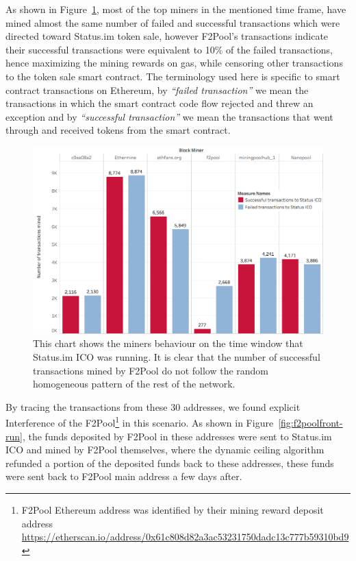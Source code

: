 As shown in Figure~\ref{fig:Transactions_miners_while_status_ico_cut}, most of the top miners in the mentioned time frame, have mined almost the same number of failed and successful transactions which were directed toward Status.im token sale, however F2Pool's transactions indicate their successful transactions were equivalent to 10\% of the failed transactions, hence maximizing the mining rewards on gas, while censoring other transactions to the token sale smart contract. The terminology used here is specific to smart contract transactions on Ethereum, by \textit{``failed transaction''} we mean the transactions in which the smart contract code flow rejected and threw an exception and by \textit{``successful transaction''} we mean the transactions that went through and received tokens from the smart contract. 


\begin{figure}[h]
\centering
\includegraphics[width=0.7\linewidth]{figures/Transactions_miners_while_status_ico_cut_only_icotx.png}
\caption{This chart shows the miners behaviour on the time window that Status.im ICO was running. It is clear that the number of successful transactions mined by F2Pool do not follow the random homogeneous pattern of the rest of the network. \label{fig:Transactions_miners_while_status_ico_cut}} 
\end{figure}


By tracing the transactions from these 30 addresses, we found explicit Interference of the F2Pool\footnote{F2Pool Ethereum address was identified by their mining reward deposit address \url{https://etherscan.io/address/0x61c808d82a3ac53231750dadc13c777b59310bd9}} in this scenario. As shown in Figure~\ref{fig:f2poolfront-run}, the funds deposited by F2Pool in these addresses were sent to Status.im ICO and mined by F2Pool themselves, where the dynamic ceiling algorithm refunded a portion of the deposited funds back to these addresses, these funds were sent back to F2Pool main address a few days after. 


